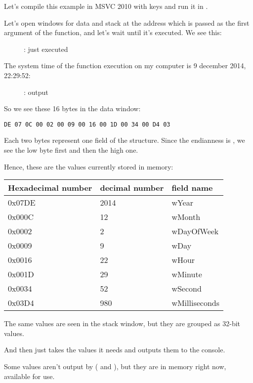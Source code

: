 ﻿\clearpage
\subsectionold{\olly}
\myindex{\olly}

Let's compile this example in MSVC 2010 with  keys and run it in \olly.

Let's open windows for data and stack at the address which is passed as the first argument of the
 function, and let's wait until it's executed. We see this:

\begin{figure}[H]
\centering
{}
\caption{\olly:  just executed}
\label{fig:struct_olly_1}
\end{figure}

The system time of the function execution on my computer is 9 december 2014, 22:29:52:

\begin{figure}[H]
\centering
{}
\caption{\olly: \printf output}
\label{fig:struct_olly_2}
\end{figure}

So we see these 16 bytes in the
data window: 
\begin{lstlisting}
DE 07 0C 00 02 00 09 00 16 00 1D 00 34 00 D4 03
\end{lstlisting}

Each two bytes represent one field of the structure. 
Since the \gls{endianness} is , 
we see the low byte first and then the high one.

Hence, these are the values currently stored in memory:

\begin{center}
\begin{tabular}{ | l | l | l | }
\hline
\headercolor{} Hexadecimal number & 
\headercolor{} decimal number & 
\headercolor{} field name \\
\hline
0x07DE & 2014	& wYear \\
\hline
0x000C & 12	& wMonth \\
\hline
0x0002 & 2	& wDayOfWeek \\
\hline
0x0009 & 9	& wDay \\
\hline
0x0016 & 22	& wHour \\
\hline
0x001D & 29	& wMinute \\
\hline
0x0034 & 52	& wSecond \\
\hline	
0x03D4 & 980	& wMilliseconds \\
\hline
\end{tabular}
\end{center}

The same values are seen in the stack window, but they are grouped as 32-bit values.

And then \printf just takes the values it needs and outputs them to the console.

Some values aren't output by \printf  ( and ), 
but they are in memory right now, available for use.


